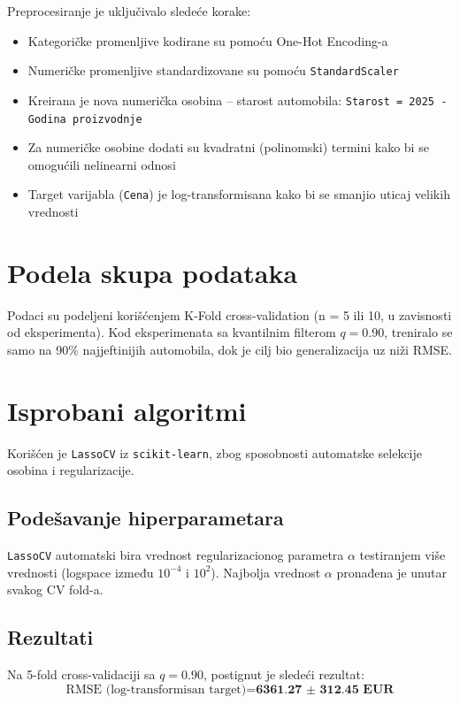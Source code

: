 \documentclass[a4paper,12pt]{article}
\begin{document}
Preprocesiranje je uključivalo sledeće korake:
\begin{itemize}
    \item Kategoričke promenljive kodirane su pomoću One-Hot Encoding-a
    \item Numeričke promenljive standardizovane su pomoću \texttt{StandardScaler}
    \item Kreirana je nova numerička osobina -- starost automobila: \texttt{Starost = 2025 - Godina proizvodnje}
    \item Za numeričke osobine dodati su kvadratni (polinomski) termini kako bi se omogućili nelinearni odnosi
    \item Target varijabla (\texttt{Cena}) je log-transformisana kako bi se smanjio uticaj velikih vrednosti
\end{itemize}

\section{Podela skupa podataka}

Podaci su podeljeni korišćenjem K-Fold cross-validation (n = 5 ili 10, u zavisnosti od eksperimenta). Kod eksperimenata sa kvantilnim filterom $q=0.90$, treniralo se samo na 90\% najjeftinijih automobila, dok je cilj bio generalizacija uz niži RMSE.

\section{Isprobani algoritmi}

Korišćen je \texttt{LassoCV} iz \texttt{scikit-learn}, zbog sposobnosti automatske selekcije osobina i regularizacije.

\subsection{Podešavanje hiperparametara}

\texttt{LassoCV} automatski bira vrednost regularizacionog parametra $\alpha$ testiranjem više vrednosti (logspace između $10^{-4}$ i $10^2$). Najbolja vrednost $\alpha$ pronađena je unutar svakog CV fold-a.

\subsection{Rezultati}

Na 5-fold cross-validaciji sa $q=0.90$, postignut je sledeći rezultat:
\[
\text{RMSE (log-transformisan target)} = \textbf{6361.27 ± 312.45 EUR}
\]
\end{document}
